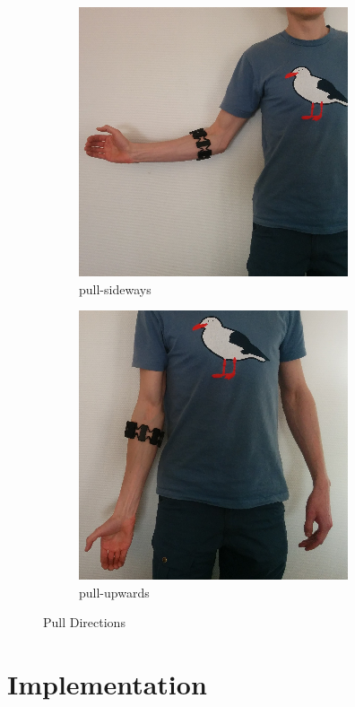 \documentclass[journal]{IEEEtran}
\begin{document}
\begin{figure}[t!]
\begin{subfigure}{0.25\textwidth}
        \centering
        \includegraphics[width=.8\linewidth]{img/pull-sideways}
        \caption{pull-sideways}
    \end{subfigure}%
        \begin{subfigure}{0.25\textwidth}
        \centering
        \includegraphics[width=.8\linewidth]{img/pull-upwards}
        \caption{pull-upwards}
    \end{subfigure}%
    \caption{Pull Directions} \label{tags}
\end{figure}
    
\section{Implementation}
\end{document}

